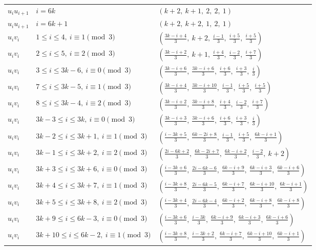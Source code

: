 \begin{longtable}{lll}
$u_i u_{i+1}$ & $i = 6k$ & $(k+2,\ k+1,\ 2,\ 2,\ 1)$ \\
$u_i u_{i+1}$ & $i = 6k+1$ & $(k+2,\ k+2,\ 1,\ 2,\ 1)$ \\
$u_i v_i$ & $1 \le i \le 4,\ i \equiv 1 \pmod{3}$ & $(\frac{3k-i+4}{3},\ k+2,\ \frac{i-1}{3},\ \frac{i+5}{3},\ \frac{i+5}{3})$ \\
$u_i v_i$ & $2 \le i \le 5,\ i \equiv 2 \pmod{3}$ & $(\frac{3k-i+2}{3},\ k+1,\ \frac{i+4}{3},\ \frac{i-2}{3},\ \frac{i+7}{3})$ \\
$u_i v_i$ & $3 \le i \le 3k-6,\ i \equiv 0 \pmod{3}$ & $(\frac{3k-i+6}{3},\ \frac{3k-i+6}{3},\ \frac{i+6}{3},\ \frac{i+3}{3},\ \frac{i}{3})$ \\
$u_i v_i$ & $7 \le i \le 3k-5,\ i \equiv 1 \pmod{3}$ & $(\frac{3k-i+4}{3},\ \frac{3k-i+10}{3},\ \frac{i-1}{3},\ \frac{i+5}{3},\ \frac{i+5}{3})$ \\
$u_i v_i$ & $8 \le i \le 3k-4,\ i \equiv 2 \pmod{3}$ & $(\frac{3k-i+2}{3},\ \frac{3k-i+8}{3},\ \frac{i+4}{3},\ \frac{i-2}{3},\ \frac{i+7}{3})$ \\
$u_i v_i$ & $3k-3 \le i \le 3k,\ i \equiv 0 \pmod{3}$ & $(\frac{3k-i+3}{3},\ \frac{3k-i+6}{3},\ \frac{i+6}{3},\ \frac{i+3}{3},\ \frac{i}{3})$ \\
$u_i v_i$ & $3k-2 \le i \le 3k+1,\ i \equiv 1 \pmod{3}$ & $(\frac{i-3k+5}{3},\ \frac{6k-2i+8}{3},\ \frac{i-1}{3},\ \frac{i+5}{3},\ \frac{6k-i+1}{3})$ \\
$u_i v_i$ & $3k-1 \le i \le 3k+2,\ i \equiv 2 \pmod{3}$ & $(\frac{2i-6k+2}{3},\ \frac{6k-2i+7}{3},\ \frac{6k-i+2}{3},\ \frac{i-2}{3},\ k+2)$ \\
$u_i v_i$ & $3k+3 \le i \le 3k+6,\ i \equiv 0 \pmod{3}$ & $(\frac{i-3k+6}{3},\ \frac{2i-6k-6}{3},\ \frac{6k-i+9}{3},\ \frac{6k-i+3}{3},\ \frac{6k-i+6}{3})$ \\
$u_i v_i$ & $3k+4 \le i \le 3k+7,\ i \equiv 1 \pmod{3}$ & $(\frac{i-3k+8}{3},\ \frac{2i-6k-5}{3},\ \frac{6k-i+7}{3},\ \frac{6k-i+10}{3},\ \frac{6k-i+1}{3})$ \\
$u_i v_i$ & $3k+5 \le i \le 3k+8,\ i \equiv 2 \pmod{3}$ & $(\frac{i-3k+4}{3},\ \frac{2i-6k-4}{3},\ \frac{6k-i+2}{3},\ \frac{6k-i+8}{3},\ \frac{6k-i+8}{3})$ \\
$u_i v_i$ & $3k+9 \le i \le 6k-3,\ i \equiv 0 \pmod{3}$ & $(\frac{i-3k+6}{3},\ \frac{i-3k}{3},\ \frac{6k-i+9}{3},\ \frac{6k-i+3}{3},\ \frac{6k-i+6}{3})$ \\
$u_i v_i$ & $3k+10 \le i \le 6k-2,\ i \equiv 1 \pmod{3}$ & $(\frac{i-3k+8}{3},\ \frac{i-3k+2}{3},\ \frac{6k-i+7}{3},\ \frac{6k-i+10}{3},\ \frac{6k-i+1}{3})$ \\

\end{longtable}
